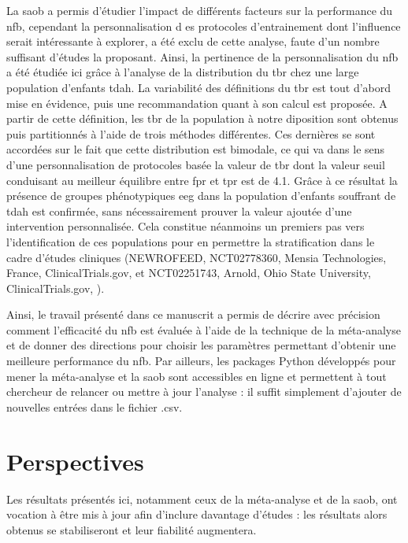 La \gls{saob} a permis d'étudier l'impact de différents facteurs sur la performance du \gls{nfb}, cependant la personnalisation d
es protocoles d'entrainement dont l'influence serait intéressante 
à explorer, a été exclu de cette analyse, faute d'un nombre suffisant d'études la proposant. Ainsi, la pertinence de la personnalisation 
du \gls{nfb} a été étudiée ici grâce à l'analyse de la distribution 
du \gls{tbr} chez une large population d'enfants \gls{tdah}. La variabilité des définitions du \gls{tbr} est tout d'abord mise en 
évidence, puis une recommandation quant à son calcul est proposée. A partir de cette définition, les \gls{tbr} de la population à notre diposition
sont obtenus puis partitionnés à l'aide de trois méthodes différentes. Ces dernières se sont accordées sur le fait que cette distribution 
est bimodale, ce qui va dans 
le sens d'une personnalisation de protocoles basée la valeur de \gls{tbr} dont la valeur seuil conduisant au meilleur équilibre entre 
\gls{fpr} et \gls{tpr} est de 4.1. 
Grâce à ce résultat la présence de 
groupes phénotypiques \gls{eeg} dans la population d'enfants souffrant de \gls{tdah} est confirmée, sans nécessairement prouver la valeur ajoutée d'une 
intervention personnalisée. Cela constitue néanmoins un premiers pas vers l'identification de ces populations pour en 
permettre la stratification dans le cadre d'études cliniques (NEWROFEED, NCT02778360, Mensia Technologies, France, ClinicalTrials.gov, \citet{Bioulac2019} et NCT02251743, Arnold, Ohio State University, 
ClinicalTrials.gov, \citet{Kerson2013}).

Ainsi, le travail présenté dans ce manuscrit a permis de décrire avec précision comment l'efficacité du \gls{nfb} est évaluée à l'aide de 
la technique de la méta-analyse et de donner des 
directions pour choisir les paramètres permettant d'obtenir une meilleure performance du \gls{nfb}. Par ailleurs, les packages Python développés pour mener 
la méta-analyse et la \gls{saob}
sont accessibles en ligne et permettent à tout chercheur de relancer ou mettre à jour l'analyse : il suffit simplement d'ajouter de nouvelles 
entrées dans le fichier .csv.


\section{Perspectives}

Les résultats présentés ici, notamment ceux de la méta-analyse et de la \gls{saob}, ont vocation à être mis à jour afin d'inclure davantage 
d'études : les résultats alors obtenus se stabiliseront et leur fiabilité augmentera.   


